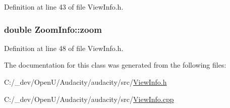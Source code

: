 Definition at line 43 of file View\+Info.\+h.

\subsubsection[{\texorpdfstring{zoom}{zoom}}]{\setlength{\rightskip}{0pt plus 5cm}double Zoom\+Info\+::zoom\hspace{0.3cm}{\ttfamily [protected]}}\hypertarget{class_zoom_info_a6a9981680af013ef05118dbd4c5173ce}{}\label{class_zoom_info_a6a9981680af013ef05118dbd4c5173ce}


Definition at line 48 of file View\+Info.\+h.



The documentation for this class was generated from the following files\+:\begin{DoxyCompactItemize}
\item 
C\+:/\+\_\+dev/\+Open\+U/\+Audacity/audacity/src/\hyperlink{_view_info_8h}{View\+Info.\+h}\item 
C\+:/\+\_\+dev/\+Open\+U/\+Audacity/audacity/src/\hyperlink{_view_info_8cpp}{View\+Info.\+cpp}\end{DoxyCompactItemize}
